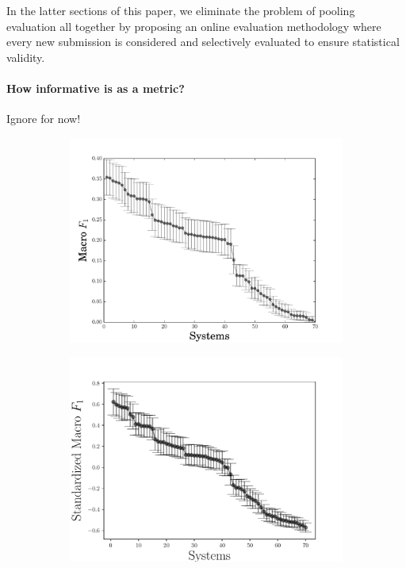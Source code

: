 %
In the latter sections of this paper, we eliminate the problem of pooling evaluation all together by proposing an online evaluation methodology where every new submission is considered and selectively evaluated to ensure statistical validity.

\paragraph{How informative is \fone{} as a metric?}
\ac{Ignore for now!}
\begin{figure}
  \begin{subfigure}{0.49\textwidth}
  \includegraphics[width=\columnwidth]{figures/experiment1}
  \caption{\label{fig:f1}}
  \end{subfigure}
  \begin{subfigure}{0.49\textwidth}
  \includegraphics[width=\columnwidth]{figures/experiment3}
  \caption{\label{fig:sf1}}
  \end{subfigure}
  \caption{}
\end{figure}


